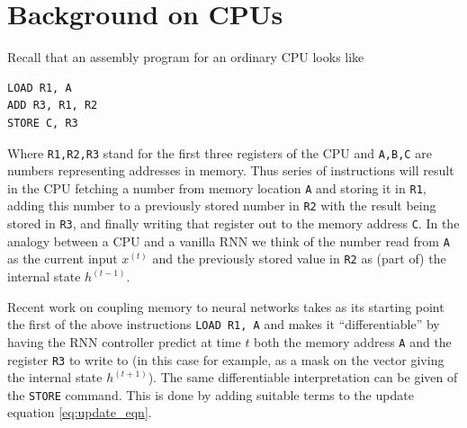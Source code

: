 \documentclass[english,letter paper,12pt,leqno]{article}
\theoremstyle{example}
\newtheorem{example}[theorem]{Example}
\numberwithin{equation}{section}
\begin{document}

\section{Background on CPUs}\label{section:appendix_cpu}

Recall that an assembly program for an ordinary CPU looks like
\begin{verbatim}
LOAD R1, A
ADD R3, R1, R2
STORE C, R3
\end{verbatim}
Where \verb+R1,R2,R3+ stand for the first three registers of the CPU and \verb+A,B,C+ are numbers representing addresses in memory. Thus series of instructions will result in the CPU fetching a number from memory location \verb+A+ and storing it in \verb+R1+, adding this number to a previously stored number in \verb+R2+ with the result being stored in \verb+R3+, and finally writing that register out to the memory address \verb+C+. In the analogy between a CPU and a vanilla RNN we think of the number read from \verb+A+ as the current input $x^{(t)}$ and the previously stored value in \verb+R2+ as (part of) the internal state $h^{(t-1)}$.

Recent work \cite{??,??} on coupling memory to neural networks takes as its starting point the first of the above instructions \verb+LOAD R1, A+ and makes it ``differentiable'' by having the RNN controller predict at time $t$ both the memory address \verb+A+ and the register \verb+R3+ to write to (in this case for example, as a mask on the vector giving the internal state $h^{(t+1)}$). The same differentiable interpretation can be given of the \verb+STORE+ command. This is done by adding suitable terms to the update equation \eqref{eq:update_eqn}.
\end{document}
